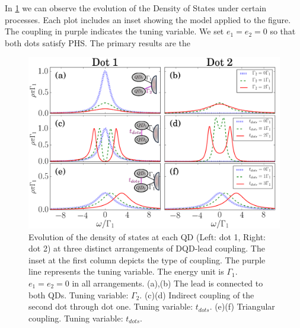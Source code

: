 In \ref{fig:GreenDQD} we can observe the evolution of the Density of States under certain processes. Each plot includes an inset showing the model applied to the figure. The coupling in purple indicates the tuning variable. We set $e_1 = e_2 = 0$ so that both dots satisfy PHS. The primary results are the 

    \begin{figure}[t]
        \centering
         \includegraphics[scale=0.47]{IMAGES/DQD/Non-interacting.png}
         \caption{\label{fig:GreenDQD} Evolution of the density of states at each QD (Left: dot 1, Right: dot 2) at three distinct arrangements of DQD-lead coupling. The inset at the first column depicts the type of coupling. The purple line represents the tuning variable. The energy unit is $\Gamma_1$. $e_1 =e_2 =0$ in all arrangements. (a),(b) The lead is connected to both QDs. Tuning variable: $\Gamma_2$. (c)(d) Indirect coupling of the second dot through dot one. Tuning variable: $t_{dots}$. (e)(f) Triangular coupling. Tuning variable: $t_{dots}$.  
         \protect\Source{   }}
    \end{figure}


